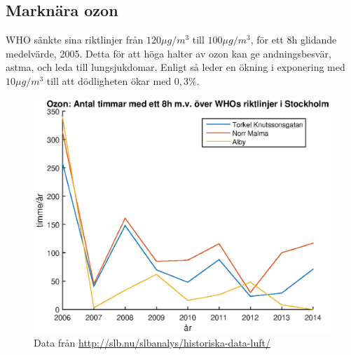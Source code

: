 \subsection{Marknära ozon}
WHO sänkte sina riktlinjer från $120 \mu g/m^3$ till $100 \mu g/m^3$, för ett 8h glidande medelvärde, 2005. Detta för att höga halter av ozon kan ge andningsbesvär, astma, och leda till lungsjukdomar. Enligt \cite{whoAir} så leder en ökning i exponering med $10 \mu g/m^3$ till att dödligheten ökar med $0,3\%$.
\begin{figure}
	\centering
	\includegraphics[width=.8\textwidth]{Bilder/ozone}
	\caption{Data från \url{http://slb.nu/slbanalys/historiska-data-luft/}}
	\label{fig:Ozone}
\end{figure}
